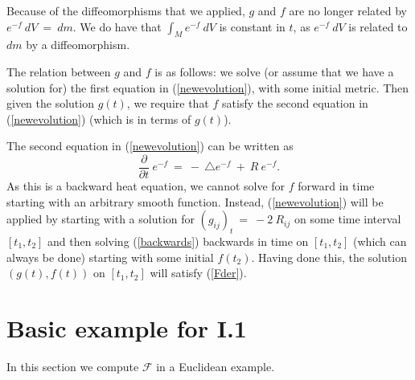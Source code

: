 \documentclass[12pt]{amsart}
\numberwithin{equation}{section}
\theoremstyle{plain}
\theoremstyle{definition}
\theoremstyle{remark}
\begin{document}
Because of the diffeomorphisms that we applied,
$g$ and $f$ are no longer related by
$e^{-f} \: dV \: = \: dm$. We do have that
$\int_M e^{-f} \: dV$ is constant in $t$, as 
$e^{-f} \: dV$ is related to $dm$ by a diffeomorphism.

The relation between $g$ and $f$ is as follows: 
we solve (or assume that we have a solution for) 
the first equation in (\ref{newevolution}), with some initial
metric.
Then given the solution $g(t)$, we require that $f$ satisfy 
the second equation in (\ref{newevolution}) (which is in
terms of $g(t)$). 

The second equation in
(\ref{newevolution}) can be written as
\begin{equation} \label{backwards}
\frac{\partial}{\partial t} \: e^{-f} \: = \: - \: \triangle e^{-f}
\: + \: R \: e^{-f}.
\end{equation}
As this is a backward heat equation, we cannot solve for $f$
forward in time starting with an arbitrary smooth function.
Instead, (\ref{newevolution}) will be applied by
starting with a solution for $(g_{ij})_t \: = \: -2 \: R_{ij}$ on
some time interval $[t_1, t_2]$ and then solving
(\ref{backwards}) backwards in time on $[t_1, t_2]$
(which can always be done) starting with some initial
$f(t_2)$. Having done this, the solution $(g(t), f(t))$ on $[t_1, t_2]$
will satisfy (\ref{Fder}).

\section{Basic example for I.1}

In this section we compute ${\mathcal F}$ in a Euclidean example.
\end{document}
